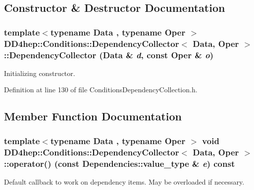 \subsection{Constructor \& Destructor Documentation}
\hypertarget{class_d_d4hep_1_1_conditions_1_1_dependency_collector_a7631c949b34eeb87fa8aea7ea166c356}{
\subsubsection[{DependencyCollector}]{\setlength{\rightskip}{0pt plus 5cm}template$<$typename Data , typename Oper $>$ {\bf DD4hep::Conditions::DependencyCollector}$<$ Data, Oper $>$::{\bf DependencyCollector} (Data \& {\em d}, \/  const Oper \& {\em o})}}
\label{class_d_d4hep_1_1_conditions_1_1_dependency_collector_a7631c949b34eeb87fa8aea7ea166c356}


Initializing constructor. 

Definition at line 130 of file ConditionsDependencyCollection.h.

\subsection{Member Function Documentation}
\hypertarget{class_d_d4hep_1_1_conditions_1_1_dependency_collector_ad8e119796883e4557be7ef862fae7ac5}{
\subsubsection[{operator()}]{\setlength{\rightskip}{0pt plus 5cm}template$<$typename Data , typename Oper $>$ void {\bf DD4hep::Conditions::DependencyCollector}$<$ Data, Oper $>$::operator() (const Dependencies::value\_\-type \& {\em e}) const}}
\label{class_d_d4hep_1_1_conditions_1_1_dependency_collector_ad8e119796883e4557be7ef862fae7ac5}


Default callback to work on dependency items. May be overloaded if necessary. 

